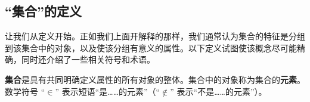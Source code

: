 \subsection{``集合''的定义}

让我们从定义开始。正如我们上面开解释的那样，我们通常认为集合的特征是分组到该集合中的对象，以及使该分组有意义的属性。以下定义试图使该概念尽可能精确，同时还介绍了一些相关符号和术语。

\begin{definition}
    \textbf{集合}是具有共同明确定义属性的所有对象的整体。集合中的对象称为集合的\textbf{元素}。数学符号 ``$\in$'' 表示短语``是……的元素''（``$\notin$'' 表示``不是……的元素''）。
\end{definition}
